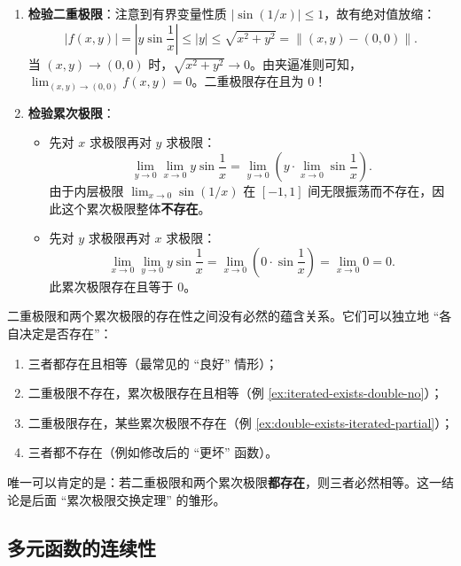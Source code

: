 \documentclass[lang=cn,11pt]{elegantbook}
\begin{document}
\begin{solution}
\begin{enumerate}
  \item \textbf{检验二重极限}：注意到有界变量性质 $|\sin(1/x)|\leqslant  1$，故有绝对值放缩：
  \[
  |f(x,y)|=\left|y\sin\frac1x\right|\leq|y|\leq\sqrt{x^2+y^2}=\|(x,y)-(0,0)\|.
  \]
  当 $(x,y)\to(0,0)$ 时，$\sqrt{x^2+y^2} \to 0$。由夹逼准则可知，$\displaystyle\lim_{(x,y)\to(0,0)}f(x,y)=0$。二重极限存在且为 0！

  \item \textbf{检验累次极限}：
  \begin{itemize}
    \item 先对 $x$ 求极限再对 $y$ 求极限：
    \[
    \lim_{y\to 0}\lim_{x\to 0}y\sin\frac1x = \lim_{y\to 0}\left(y\cdot \lim_{x\to 0}\sin\frac1x\right).
    \]
    由于内层极限 $\lim_{x\to 0}\sin(1/x)$ 在 $[-1,1]$ 间无限振荡而不存在，因此这个累次极限整体\textbf{不存在}。
    \item 先对 $y$ 求极限再对 $x$ 求极限：
    \[
    \lim_{x\to 0}\lim_{y\to 0}y\sin\frac1x = \lim_{x\to 0}\left(0\cdot\sin\frac1x\right) = \lim_{x\to 0}0 = 0.
    \]
    此累次极限存在且等于 $0$。
  \end{itemize}
\end{enumerate}

\end{solution}

\begin{remark}[总结：四种可能的组合]
二重极限和两个累次极限的存在性之间没有必然的蕴含关系。它们可以独立地 ``各自决定是否存在''：
\begin{enumerate}
  \item 三者都存在且相等（最常见的 ``良好'' 情形）；
  \item 二重极限不存在，累次极限存在且相等（例 \ref{ex:iterated-exists-double-no}）；
  \item 二重极限存在，某些累次极限不存在（例 \ref{ex:double-exists-iterated-partial}）；
  \item 三者都不存在（例如修改后的 ``更坏'' 函数）。
\end{enumerate}
唯一可以肯定的是：若二重极限和两个累次极限\textbf{都存在}，则三者必然相等。这一结论是后面 ``累次极限交换定理'' 的雏形。
\end{remark}


\subsection{多元函数的连续性}
\end{document}
